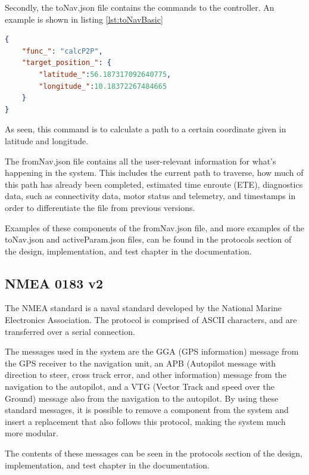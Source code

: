 Secondly, the toNav.json file contains the commands to the controller. An example is shown in listing \ref{lst:toNavBasic}

\begin{lstlisting}[caption = {Example of a calcP2P call in the toNav.JSON}, captionpos=b, label={lst:toNavCalcP2P}, language=json,firstnumber=1]
{
	"func_": "calcP2P",
	"target_position_": {
		"latitude_":56.187317092640775,
		"longitude_":10.18372267484665
	}
}
\end{lstlisting}

As seen, this command is to calculate a path to a certain coordinate given in latitude and longitude. 

The fromNav.json file contains all the user-relevant information for what's happening in the system. This includes the current path to traverse, how much of this path has already been completed, estimated time enroute (ETE), diagnostics data, such as connectivity data, motor status and telemetry, and timestamps in order to differentiate the file from previous versions.

 Examples of these components of the fromNav.json file, and more examples of the toNav.json and activeParam.json files, can be found in the protocols section of the design, implementation, and test chapter in the documentation.

\subsection{NMEA 0183 v2}

The NMEA standard is a naval standard developed by the National Marine Electronics Association. The protocol is comprised of ASCII characters, and are transferred over a serial connection. 

The messages used in the system are the GGA (GPS information) message from the GPS receiver to the navigation unit, an APB (Autopilot message with direction to steer, cross track error, and other information) message from the navigation to the autopilot, and a VTG (Vector Track and speed over the Ground) message also from the navigation to the autopilot. By using these standard messages, it is possible to remove a component from the system and insert a replacement that also follows this protocol, making the system much more modular.

The contents of these messages can be seen in the protocols section of the design, implementation, and test chapter in the documentation. 

